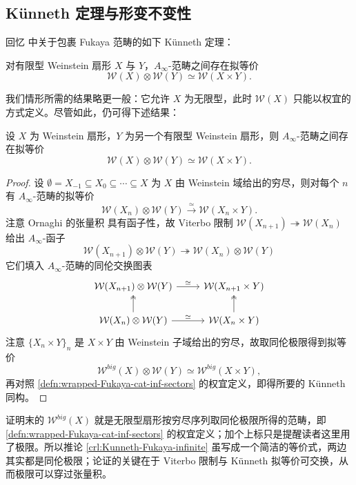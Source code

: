 \subsection{K\"unneth 定理与形变不变性}
    回忆 \cite{GPS24S} 中关于包裹 Fukaya 范畴的如下 K\"unneth 定理：
\begin{thm}\label{thm:Kunneth-theorem-Fukaya-cat}
    对有限型 Weinstein 扇形 $X$ 与 $Y$，$A_{\infty}$-范畴之间存在拟等价
\[
        \mathcal{W} (X)\otimes\mathcal{W} (Y)\simeq\mathcal{W} (X\times Y).
    \]
\end{thm}
    我们情形所需的结果略更一般：它允许 $X$ 为无限型，此时 $\mathcal{W} (X)$ 只能以权宜的方式定义。尽管如此，仍可得下述结果：
\begin{crl}\label{crl:Kunneth-Fukaya-infinite}
    设 $X$ 为 Weinstein 扇形，$Y$ 为另一个有限型 Weinstein 扇形，则 $A_{\infty}$-范畴之间存在拟等价
\[
        \mathcal{W} (X)\otimes\mathcal{W} (Y)\simeq\mathcal{W} (X\times Y).
    \]
\end{crl}
\begin{proof}
    设 $\emptyset=X_{-1}\subseteq X_0\subseteq\dotsb\subseteq X$ 为 $X$ 由 Weinstein 域给出的穷尽，则对每个 $n$ 有 $A_{\infty}$-范畴的拟等价
\[
        \mathcal{W} (X_n)\otimes\mathcal{W} (Y)\xrightarrow{\simeq}\mathcal{W} (X_n\times Y).
    \]
注意 Ornaghi 的张量积 \cite{Ornaghi25} 具有函子性，故 Viterbo 限制 $\mathcal{W} (X_{n+1})\twoheadrightarrow\mathcal{W} (X_n)$ 给出 $A_{\infty}$-函子
\[
        \mathcal{W} (X_{n+1})\otimes\mathcal{W} (Y)\twoheadrightarrow\mathcal{W} (X_n)\otimes\mathcal{W} (Y)
    \]
它们填入 $A_{\infty}$-范畴的同伦交换图表
\[
        \begin{tikzcd}
            \mathcal{W} (X_{n+1})\otimes \mathcal{W} (Y)\arrow[r,"\simeq"]&\mathcal{W} (X_{n+1}\times Y)\\ 
            \mathcal{W} (X_n)\otimes\mathcal{W} (Y)\arrow[u,two heads]\arrow[r,"\simeq"]&\mathcal{W} (X_n\times Y)\arrow[u,two heads]
        \end{tikzcd}
    \]
注意 $\{X_n\times Y\}_n$ 是 $X\times Y$ 由 Weinstein 子域给出的穷尽，故取同伦极限得到拟等价
\[
        \mathcal{W}^{big} (X)\otimes\mathcal{W}(Y)\simeq\mathcal{W}^{big} (X\times Y),
    \]
再对照 \ref{defn:wrapped-Fukaya-cat-inf-sectors} 的权宜定义，即得所要的 K\"unneth 同构。
\end{proof}

\begin{yizhu}
    证明末的 $\mathcal{W}^{big}(X)$ 就是无限型扇形按穷尽序列取同伦极限所得的范畴，即 \ref{defn:wrapped-Fukaya-cat-inf-sectors} 的权宜定义；加个上标只是提醒读者这里用了极限。所以推论 \ref{crl:Kunneth-Fukaya-infinite} 虽写成一个简洁的等价式，两边其实都是同伦极限；论证的关键在于 Viterbo 限制与 K\"unneth 拟等价可交换，从而极限可以穿过张量积。
\end{yizhu}


